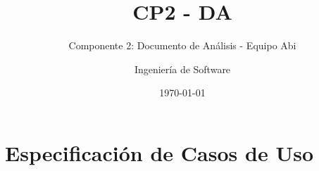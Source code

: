 \documentclass[10pt]{book}
\title{CP2 - DA}
\subtitle{Componente 2: Documento de Análisis - Equipo Abi}
\author{Ingeniería de Software}
\date{\today}
\begin{document}
\maketitle
\thispagestyle{empty}
\tableofcontents

%
%

\chapter{Especificación de Casos de Uso}



%

\end{document}
